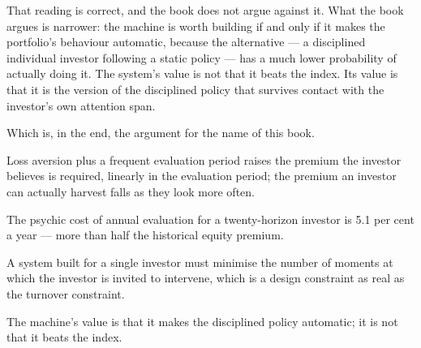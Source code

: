 That reading is correct, and the book does not argue against it. What the
book argues is narrower: the machine is worth building if and only if it
makes the portfolio's behaviour automatic, because the alternative --- a
disciplined individual investor following a static policy --- has a much
lower probability of actually doing it. The system's value is not that it
beats the index. Its value is that it is the version of the disciplined
policy that survives contact with the investor's own attention span.

Which is, in the end, the argument for the name of this book.

\begin{keytakeaways}
\item Loss aversion plus a frequent evaluation period raises the premium
the investor believes is required, linearly in the evaluation period; the
premium an investor can actually harvest falls as they look more often.
\item The psychic cost of annual evaluation for a twenty-horizon investor is
5.1 per cent a year --- more than half the historical equity premium.
\item A system built for a single investor must minimise the number of
moments at which the investor is invited to intervene, which is a design
constraint as real as the turnover constraint.
\item The machine's value is that it makes the disciplined policy
automatic; it is not that it beats the index.
\end{keytakeaways}
